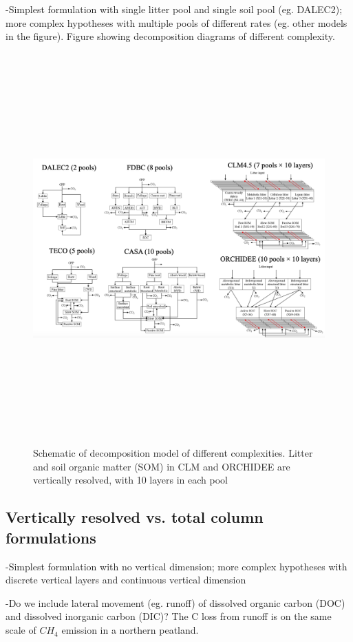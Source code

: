 \documentclass[twoside,10pt]{report}
\begin{document}
-Simplest formulation with single litter pool and single soil pool (eg. DALEC2); more complex hypotheses with multiple pools of different rates (eg. other models in the figure). Figure showing decomposition diagrams of different complexity.
\begin{figure}[htb]
\includegraphics[width=15cm,height=15cm,keepaspectratio]{CLIMA-land/LM_figures/DOC_Diagrams_diff_complexity.png}
\caption{Schematic of decomposition model of different complexities. Litter and soil organic matter (SOM) in CLM and ORCHIDEE are vertically resolved, with 10 layers in each pool}
\label{f:Diagrams of soil organic carbon schemes of different complexities.}
\end{figure}


\subsection{Vertically resolved vs. total column formulations}

-Simplest formulation with no vertical dimension; more complex hypotheses with discrete vertical layers and continuous vertical dimension

-Do we include lateral movement (eg. runoff) of dissolved organic carbon (DOC) and dissolved inorganic carbon (DIC)? The C loss from runoff is on the same scale of $CH_4$ emission in a northern peatland.
\end{document}
